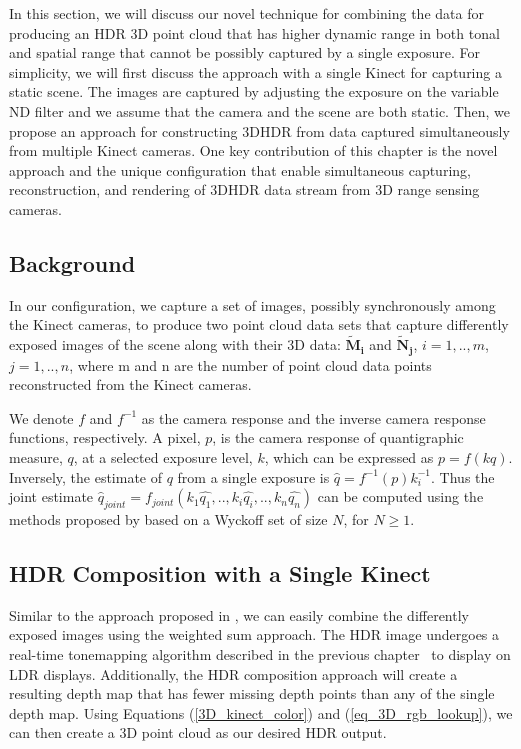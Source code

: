 In this section, we will discuss our novel technique for combining the data for producing an HDR 3D point cloud that has higher dynamic range in both tonal and spatial range that cannot be possibly captured by a single exposure. For simplicity, we will first discuss the approach with a single Kinect for capturing a static scene. The images are captured by adjusting the exposure on the variable ND filter and we assume that the camera and the scene are both static. Then, we propose an approach for constructing 3DHDR from data captured simultaneously from multiple Kinect cameras. One key contribution of this chapter is the novel approach and the unique configuration that enable simultaneous capturing, reconstruction, and rendering of 3DHDR data stream from 3D range sensing cameras. 

\subsection{Background}
In our configuration, we capture a set of images, possibly synchronously among the Kinect cameras, to produce two point cloud data sets that capture differently exposed images of the scene along with their 3D data: $\mathbf{\tilde{M}_{i}}$ and $\mathbf{\tilde{N}_{j}}$, $i=1,..,m$, $j=1,..,n$, where m and n are the number of point cloud data points reconstructed from the Kinect cameras.

We denote $f$ and $f^{-1}$ as the camera response and the inverse camera response functions, respectively. A pixel, $p$, is the camera response of quantigraphic measure, $q$, at a selected exposure level, $k$, which can be expressed as $p = f(kq)$. Inversely, the estimate of $q$ from a single exposure is $\hat{q} = f^{-1}(p)k_i^{-1}$. Thus the joint estimate $\hat{q}_{joint} = f_{joint}(k_1\hat{q_1}, .., k_i\hat{q_i}, .., k_n\hat{q_n})$ can be computed using the methods proposed by \cite{mann1993compositing,robertson2003estimation,ali2012ICASSP} based on a Wyckoff set \cite{wyckoff1962experimental} of size $N$, for $N \ge 1$.

\subsection{HDR Composition with a Single Kinect}
\label{sec_single_kinect}
Similar to the approach proposed in \cite{lo2012high}, we can easily combine the differently exposed images using the weighted sum approach. The HDR image undergoes a real-time tonemapping algorithm described in the previous chapter~\cite{lo2012high} to display on LDR displays. Additionally, the HDR composition approach will create a resulting depth map that has fewer missing depth points than any of the single depth map. Using Equations (\ref{3D_kinect_color}) and (\ref{eq_3D_rgb_lookup}), we can then create a 3D point cloud as our desired HDR output. 

